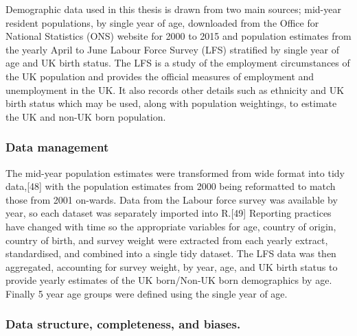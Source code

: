 \documentclass[11pt,twoside]{bristolthesis}
\begin{document}
  Demographic data used in this thesis is drawn from two main sources; mid-year resident populations, by single year of age, downloaded from the Office for National Statistics (ONS) website for 2000 to 2015 and population estimates from the yearly April to June Labour Force Survey (LFS) stratified by single year of age and UK birth status. The LFS is a study of the employment circumstances of the UK population and provides the official measures of employment and unemployment in the UK. It also records other details such as ethnicity and UK birth status which may be used, along with population weightings, to estimate the UK and non-UK born population.
  
  \hypertarget{data-management}{%
  \subsubsection{Data management}\label{data-management}}
  
  The mid-year population estimates were transformed from wide format into tidy data,{[}48{]} with the population estimates from 2000 being reformatted to match those from 2001 on-wards. Data from the Labour force survey was available by year, so each dataset was separately imported into R.{[}49{]} Reporting practices have changed with time so the appropriate variables for age, country of origin, country of birth, and survey weight were extracted from each yearly extract, standardised, and combined into a single tidy dataset. The LFS data was then aggregated, accounting for survey weight, by year, age, and UK birth status to provide yearly estimates of the UK born/Non-UK born demographics by age. Finally 5 year age groups were defined using the single year of age.
  
  \hypertarget{data-structure-completeness-and-biases.}{%
  \subsubsection{Data structure, completeness, and biases.}\label{data-structure-completeness-and-biases.}}
  
\end{document}
